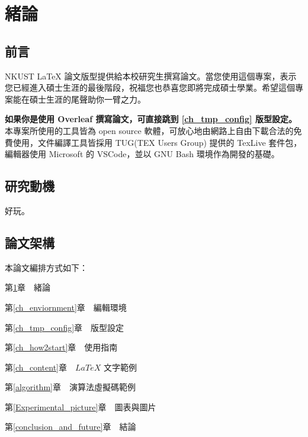 
\chapter{緒論}\label{introduction}


\section{前言}\label{preface}

NKUST LaTeX 論文版型提供給本校研究生撰寫論文。當您使用這個專案，表示您已經進入碩士生涯的最後階段，祝福您也恭喜您即將完成碩士學業。希望這個專案能在碩士生涯的尾聲助你一臂之力。

\textbf{\color{red} 如果你是使用 Overleaf 撰寫論文，可直接跳到 \ref{ch_tmp_config} 版型設定。}本專案所使用的工具皆為 open source 軟體，可放心地由網路上自由下載合法的免費使用，文件編譯工具皆採用 TUG(TEX Users Group) 提供的 TexLive 套件包，編輯器使用 Microsoft 的 VSCode，並以 GNU Bash 環境作為開發的基礎。



\newpage

\section{研究動機}\label{motive}

好玩。


\section{論文架構}\label{thesis_arch}
\n 本論文編排方式如下：

第\ref{introduction}章　緒論

第\ref{ch_enviornment}章　編輯環境

第\ref{ch_tmp_config}章　版型設定

第\ref{ch_how2start}章　使用指南

第\ref{ch_content}章　$LaTeX$ 文字範例

第\ref{algorithm}章　演算法虛擬碼範例

第\ref{Experimental_picture}章　圖表與圖片

第\ref{conclusion_and_future}章　結論
